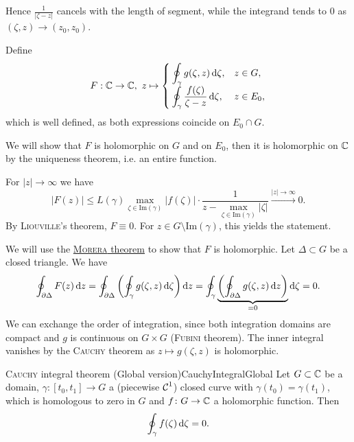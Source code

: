 \documentclass[a4paper,english]{article}
\begin{document}
\begin{pr}
\begin{itemize}
        Hence $\frac{1}{|\zeta - z |}$ cancels with the length of segment, while the integrand tends to $0$ as $(\zeta, z) \to (z_0, z_0)$.
    \end{itemize}
    
    Define
    \begin{equation*}
        F: \CC \to \CC, \ 
        z \mapsto \begin{cases}
            \displaystyle\oint_{\gamma} g(\zeta, z) \diff{\zeta}, & z \in G, \\
            \displaystyle\oint_{\gamma} \frac{f(\zeta)}{\zeta - z} \diff{\zeta}, & z \in E_0,
        \end{cases}
    \end{equation*}
    which is well defined, as both expressions coincide on $E_0 \cap G$.
    
    We will show that $F$ is holomorphic on $G$ and on $E_0$, then it is holomorphic on $\operatorname{\mathbb{C}}$ by the uniqueness theorem, i.e. an entire function.
    
    For $| z | \to \infty$ we have
    \begin{equation*}
        | F(z) |
        \le L(\gamma) \max_{\zeta \in \text{Im}(\gamma)} | f(\zeta) | \cdot \frac{1}{z - \max_{\zeta \in \text{Im}(\gamma)} | \zeta |}
        \xrightarrow{| z | \to \infty} 0.
    \end{equation*}
    By \textsc{Liouville}'s theorem, $F \equiv 0$.
    For $z \in G \setminus \text{Im}(\gamma)$, this yields the statement.
    
    We will use the \hyperref[th:morera]{\textsc{Morera} theorem} to show that $F$ is holomorphic.
    Let $\Delta \subset G$ be a closed triangle.
    We have
    \begin{align*}
        \oint_{\partial \Delta} F(z) \mathop{}\!\mathrm{d}{z}
        = \oint_{\partial \Delta} \left( \oint_{\gamma} g(\zeta, z) \mathop{}\!\mathrm{d}{\zeta} \right) \mathop{}\!\mathrm{d}{z}
        = \oint_{\gamma} \underbrace{\left( \oint_{\partial \Delta} g(\zeta, z) \mathop{}\!\mathrm{d}{z} \right)}_{= 0} \mathop{}\!\mathrm{d}{\zeta}
        = 0.
    \end{align*}
    We can exchange the order of integration, since both integration domains are compact and $g$ is continuous on $G \times G$ (\textsc{Fubini} theorem).
    The inner integral vanishes by the \textsc{Cauchy} theorem as $z \mapsto g(\zeta, z)$ is holomorphic.
\end{pr}

\begin{thm}{\textsc{Cauchy} integral theorem (Global version)}{CauchyIntegralGlobal}
    Let $G \subset \operatorname{\mathbb{C}}$ be a domain, $\gamma \colon [t_0, t_1] \to G$ a (piecewise $\operatorname{\mathcal{C}}^1$) closed curve with $\gamma(t_0) = \gamma(t_1)$, which is homologous to zero in $G$ and $f \colon G \to \operatorname{\mathbb{C}}$ a holomorphic function.
    Then
    \begin{equation*}
        \oint_{\gamma} f(\zeta) \mathop{}\!\mathrm{d}{\zeta} = 0.
    \end{equation*}
\end{thm}
\end{document}

